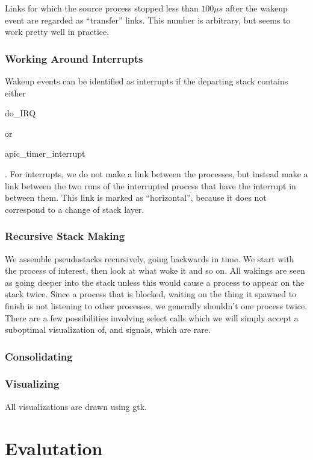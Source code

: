 \documentclass[10pt]{article}
\begin{document}
Links for which the source process stopped less than $100\mu s$ after the wakeup event are regarded as ``transfer'' links.  This number is arbitrary, but seems to work pretty well in practice.

\subsubsection{Working Around Interrupts}

Wakeup events can be identified as interrupts if the departing stack contains either \begin{tt}do\_IRQ\end{tt} or \begin{tt}apic\_timer\_interrupt\end{tt}.  For interrupts, we do not make a link between the processes, but instead make a link between the two runs of the interrupted process that have the interrupt in between them.  This link is marked as ``horizontal'', because it does not correspond to a change of stack layer.

\subsubsection{Recursive Stack Making}

We assemble pseudostacks recursively, going backwards in time.  We start with the process of interest, then look at what woke it and so on.  All wakings are seen as going deeper into the stack unless this would cause a process to appear on the stack twice.  Since a process that is blocked, waiting on the thing it spawned to finish is not listening to other processes, we generally shouldn't one process twice.  There are a few possibilities involving select calls which we will simply accept a suboptimal visualization of, and signals, which are rare.

\subsubsection{Consolidating}
\subsubsection{Visualizing}

All visualizations are drawn using gtk.

\section{Evalutation}
\end{document}
